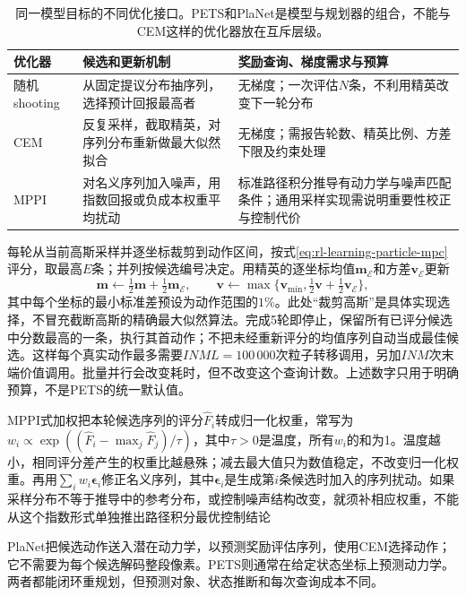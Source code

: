 \begin{table}[t]
  \centering
  \small
  \begin{tabularx}{\linewidth}{>{\raggedright\arraybackslash}p{18mm} >{\raggedright\arraybackslash}X >{\raggedright\arraybackslash}X}
    \toprule
    优化器 & 候选和更新机制 & 奖励查询、梯度需求与预算 \\
    \midrule
    随机shooting & 从固定提议分布抽序列，选择预计回报最高者 & 无梯度；一次评估$N$条，不利用精英改变下一轮分布 \\
    CEM & 反复采样，截取精英，对序列分布重新做最大似然拟合 & 无梯度；需报告轮数、精英比例、方差下限及约束处理 \\
    MPPI & 对名义序列加入噪声，用指数回报或负成本权重平均扰动 & 标准路径积分推导有动力学与噪声匹配条件；通用采样实现需说明重要性校正与控制代价 \\
    \bottomrule
  \end{tabularx}
  \caption{同一模型目标的不同优化接口。PETS和PlaNet是模型与规划器的组合，不能与CEM这样的优化器放在互斥层级。}
  \label{tab:rl-learning-trajectory-optimizers}
\end{table}

每轮从当前高斯采样并逐坐标裁剪到动作区间，按式\eqref{eq:rl-learning-particle-mpc}评分，取最高$E$条；并列按候选编号决定。用精英的逐坐标均值$\bm m_{\mathcal E}$和方差$\bm v_{\mathcal E}$更新
\[
  \bm m\gets\tfrac12\bm m+\tfrac12\bm m_{\mathcal E},
  \qquad
  \bm v\gets\max\{\bm v_{\min},
                      \tfrac12\bm v+\tfrac12\bm v_{\mathcal E}\},
\]
其中每个坐标的最小标准差预设为动作范围的$1\%$。此处“裁剪高斯”是具体实现选择，不冒充截断高斯的精确最大似然算法。完成5轮即停止，保留所有已评分候选中分数最高的一条，执行其首动作；不把未经重新评分的均值序列自动当成最佳候选。这样每个真实动作最多需要$INML=100\,000$次粒子转移调用，另加$INM$次末端价值调用。批量并行会改变耗时，但不改变这个查询计数。上述数字只用于明确预算，不是PETS的统一默认值。

MPPI式加权把本轮候选序列的评分$\widehat F_i$转成归一化权重，常写为$w_i\propto\exp((\widehat F_i-\max_j\widehat F_j)/\tau)$，其中$\tau>0$是温度，所有$w_i$的和为1。温度越小，相同评分差产生的权重比越悬殊；减去最大值只为数值稳定，不改变归一化权重。再用$\sum_iw_i\bm\epsilon_i$修正名义序列，其中$\bm\epsilon_i$是生成第$i$条候选时加入的序列扰动。如果采样分布不等于推导中的参考分布，或控制噪声结构改变，就须补相应权重，不能从这个指数形式单独推出路径积分最优控制结论

PlaNet把候选动作送入潜在动力学，以预测奖励评估序列，使用CEM选择动作；它不需要为每个候选解码整段像素。PETS则通常在给定状态坐标上预测动力学。两者都能闭环重规划，但预测对象、状态推断和每次查询成本不同。

